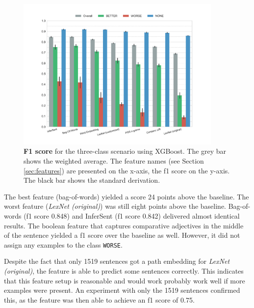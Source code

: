 \begin{figure}[htbp]
      \caption{\textbf{F1 score} for the three-class scenario using XGBoost. The grey bar shows the weighted average. The feature names (see Section \ref{sec:features}) are presented on the x-axis, the f1 score on the y-axis. The black bar shows the standard derivation.} 
    \label{fig:3_f1}
 \centering
	\includegraphics[width=0.9\textwidth]{images/experiments/f1-False}

\end{figure}


The best feature (bag-of-words) yielded a score 24 points above the baseline. The worst feature (\emph{LexNet (original)}) was still eight points above the baseline. Bag-of-words (f1 score 0.848) and InferSent (f1 score 0.842) delivered almost identical results. The boolean feature that captures comparative adjectives in the middle of the sentence yielded a f1 score over the baseline as well. However, it did not assign any examples to the class \texttt{WORSE}.

Despite the fact that only 1519 sentences got a path embedding for \emph{LexNet (original)}, the feature is able to predict some sentences correctly. This indicates that this feature setup is reasonable and would work probably work well if more examples were present. An experiment with only the 1519 sentences confirmed this, as the feature was then able to achieve an f1 score of 0.75.

